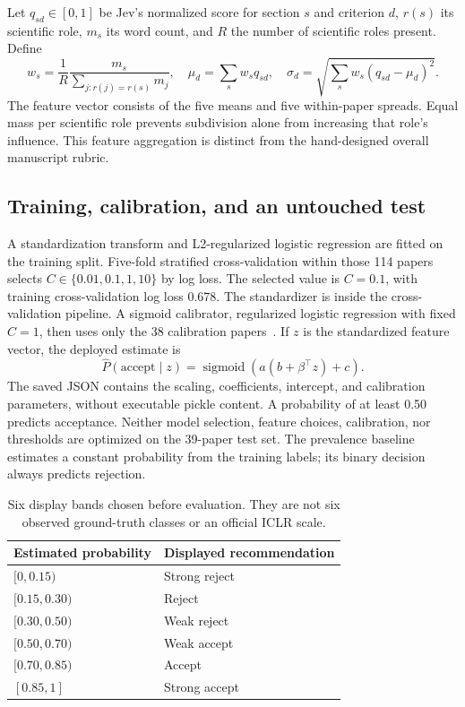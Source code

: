 \documentclass[11pt]{article}
\begin{document}
Let $q_{sd}\in[0,1]$ be Jev's normalized score for section $s$ and criterion $d$, $r(s)$ its scientific role, $m_s$ its word count, and $R$ the number of scientific roles present. Define
\begin{equation}
w_s=\frac{1}{R}\frac{m_s}{\sum_{j:r(j)=r(s)}m_j},\quad
\mu_d=\sum_s w_s q_{sd},\quad
\sigma_d=\sqrt{\sum_s w_s(q_{sd}-\mu_d)^2}.
\end{equation}
The feature vector consists of the five means and five within-paper spreads. Equal mass per scientific role prevents subdivision alone from increasing that role's influence. This feature aggregation is distinct from the hand-designed overall manuscript rubric.

\subsection{Training, calibration, and an untouched test}
A standardization transform and L2-regularized logistic regression are fitted on the training split. Five-fold stratified cross-validation within those 114 papers selects $C\in\{0.01,0.1,1,10\}$ by log loss. The selected value is $C=0.1$, with training cross-validation log loss 0.678. The standardizer is inside the cross-validation pipeline. A sigmoid calibrator, regularized logistic regression with fixed $C=1$, then uses only the 38 calibration papers~\cite{calibration}. If $z$ is the standardized feature vector, the deployed estimate is
\begin{equation}
\widehat{P}(\mathrm{accept}\mid z)=\operatorname{sigmoid}\!\left(a(b+\beta^\top z)+c\right).
\end{equation}
The saved JSON contains the scaling, coefficients, intercept, and calibration parameters, without executable pickle content. A probability of at least 0.50 predicts acceptance. Neither model selection, feature choices, calibration, nor thresholds are optimized on the 39-paper test set. The prevalence baseline estimates a constant probability from the training labels; its binary decision always predicts rejection.

\begin{table}[ht]
\centering\small
\begin{tabular}{ll}\toprule Estimated probability & Displayed recommendation \\ \midrule
$[0,0.15)$ & Strong reject \\
$[0.15,0.30)$ & Reject \\
$[0.30,0.50)$ & Weak reject \\
$[0.50,0.70)$ & Weak accept \\
$[0.70,0.85)$ & Accept \\
$[0.85,1]$ & Strong accept \\ \bottomrule
\end{tabular}
\caption{Six display bands chosen before evaluation. They are not six observed ground-truth classes or an official ICLR scale.}
\end{table}
\end{document}

